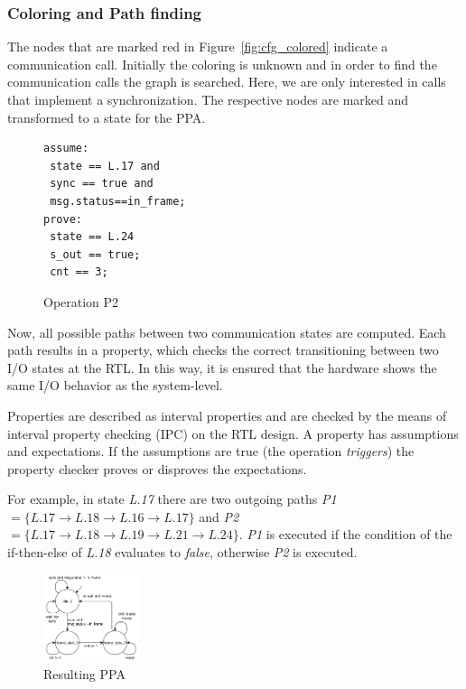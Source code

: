 \subsubsection{Coloring and Path finding}

The nodes that are marked red in Figure~\ref{fig:cfg_colored} indicate a communication call. 
Initially the coloring is unknown and in order to find the communication calls the graph is searched. 
Here, we are only interested in calls that implement a synchronization.
The respective nodes are marked and transformed to a state for the PPA. 

\begin{figure}
			\vspace{-20pt}
		\caption{Operation P2}
		\label{fig:example_operation}
		\begin{small}
		\begin{lstlisting}
assume:
 state == L.17 and
 sync == true and 	
 msg.status==in_frame;
prove: 
 state == L.24
 s_out == true;
 cnt == 3;
\end{lstlisting}
\end{small}
\end{figure}

Now, all possible paths between two communication states are computed.
Each path results in a property, which checks the correct transitioning between two I/O states at the RTL. 
In this way, it is ensured that the hardware shows the same I/O behavior as the system-level.

Properties are described as interval properties and are checked by the means of interval property checking (IPC) on the RTL design. 
A property has assumptions and expectations. 
If the assumptions are true (the operation \textit{triggers}) the property checker proves or disproves the expectations. 

For example, in state \textit{L.17} there are two outgoing paths \textit{P1}$=\{L.17\rightarrow L.18\rightarrow L.16\rightarrow L.17\}$ 
and \textit{P2}$=\{L.17\rightarrow L.18\rightarrow L.19\rightarrow L.21\rightarrow L.24\}$. 
\textit{P1} is executed if the condition of the if-then-else of \textit{L.18} evaluates to \textit{false}, otherwise \textit{P2} is executed. 
\begin{figure}
	\vspace{-20pt}
    \caption{Resulting PPA}
    \label{fig:example_PPA}
    \includegraphics[width=0.25\textwidth]{fig/Example_PPA.pdf}
\end{figure}

